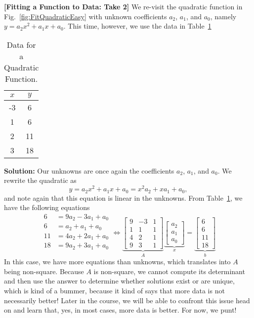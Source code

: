 \begin{example}
\label{ex:FittingEquationsB}
\textbf{[Fitting a Function to Data: Take 2]} We re-visit the quadratic function in 
Fig.~\ref{fig:FitQuadraticEasy} with unknown coefficients $a_2$, $a_1$, and $a_0$, namely
$y = a_2 x^2 + a_1 x + a_0.$ This time, however, we use the data in Table~\ref{tab:QuadraticDataChap02take2}
\begin{table}[!hbt]
\caption[]{Data for a Quadratic Function.}
\label{tab:QuadraticDataChap02take2}
\begin{center}
\begin{tabular}{||c|c||}
\hline
 $x$ & $y$\\
\hline
-3 & 6 \\
1  &   6 \\
 2    &  11 \\
3   & 18 \\
\hline
\end{tabular}
\end{center}
\end{table}
\end{example}


\textbf{Solution:} Our unknowns are once again the coefficients $a_2$, $a_1$, and $a_0$. We rewrite the quadratic as
 $$ y = a_2 x^2 + a_1 x + a_0 = x^2 a_2  + x a_1  + a_0, $$
and note again that this equation is linear in the unknowns.
From Table~\ref{tab:QuadraticDataChap02take2}, we have the following equations
\begin{equation}
\label{eq:qudraticc}
\begin{aligned}
6 &= 9 a_2 -3 a_1 + a_0 \\
6 &= a_2 + a_1 + a_0 \\
11&= 4 a_2 + 2 a_1 + a_0\\
18&= 9 a_2 + 3 a_1 + a_0\\
\end{aligned}
\iff \underbrace{\left[\begin{array}{rrr} 9 & -3 & 1 \\ 1 & 1 & 1 \\
4& 2 & 1  \\ 9 & 3 & 1\end{array}\right]}_{A} \underbrace{\left[\begin{array}{c} a_2\\ a_1 \\ a_0\end{array}\right]}_{x} =   \underbrace{\left[\begin{array}{c} 6 \\ 6\\ 11\\ 18 \end{array}\right]}_{b}
\end{equation}
In this case, we have more equations than unknowns, which translates into $A$ being non-square. Because $A$ is non-square, we cannot compute its determinant and then use the answer to determine whether solutions exist or are unique, which is kind of a bummer, because it kind of says that more data is not necessarily better! Later in the course, we will be able to confront this issue head on and learn that, yes, in most cases, more data is better. For now, we punt!
\Qed

